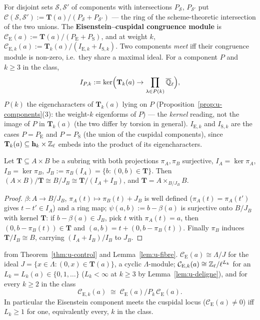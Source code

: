 \documentclass[11pt]{article}
\newcommand{\Iw}{\Lambda}                         %
\newcommand{\hcusp}{\mathbf{h}}                   %
\newcommand{\Tu}{\mathbf{T}}                      %
\newcommand{\Pk}[1]{P_{#1}}                       %
\newcommand{\Eis}{\mathrm{E}}
\newcommand{\cusp}{\mathrm{S}}
\newcommand{\Cg}{\mathcal{C}}                     %
\newcommand{\Qlb}{\overline{\Q}_\ell}
\newcommand{\Zl}{\Z_\ell}
\begin{document}
\begin{definition}\label{def:u-congmod}
For disjoint sets $\mathcal S,\mathcal S'$ of components with intersections $P_{\mathcal S}$, $P_{\mathcal S'}$ put
$\Cg(\mathcal S,\mathcal S'):=\Tu(a)/(P_{\mathcal S}+P_{\mathcal S'})$ --- the ring of the scheme-theoretic intersection of the two
unions. The \textbf{Eisenstein--cuspidal congruence module} is $\Cg_\Eis(a):=\Tu(a)/(P_\Eis+P_\cusp)$, and at weight $k$,
$\Cg_{\Eis,k}(a):=\Tu_k(a)/(I_{\Eis,k}+I_{\cusp,k})$. Two components \emph{meet} iff their congruence module is non-zero, i.e.\ they
share a maximal ideal. For a component $P$ and $k\ge3$ in the class,
\[
  I_{P,k}:=\ker\Bigl(\Tu_k(a)\to\prod_{\lambda\in P(k)}\Qlb\Bigr),
\]
$P(k)$ the eigencharacters of $\Tu_k(a)$ lying on $P$ (Proposition~\ref{prop:u-components}(3): the weight-$k$ eigenforms of $P$) --- the \emph{kernel}
reading, not the image of $P$ in $\Tu_k(a)$ (the two differ by torsion in general). $I_{\Eis,k}$ and $I_{\cusp,k}$ are the cases $P=P_\Eis$ and
$P=P_\cusp$ (the union of the cuspidal components), since $\Tu_k(a)\subseteq\hcusp_k\times\Zl$ embeds into the product of its eigencharacters.
\end{definition}

\begin{lemma}\label{lem:u-fibre}
\PROVED{} Let $\Tu\subseteq A\times B$ be a subring with both projections $\pi_A,\pi_B$ surjective, $I_A=\ker\pi_A$, $I_B=\ker\pi_B$,
$J_B:=\pi_B(I_A)=\{b:(0,b)\in\Tu\}$. Then $(A\times B)/\Tu\cong B/J_B\cong\Tu/(I_A+I_B)$, and $\Tu=A\times_{B/J_B}B$.
\end{lemma}

\begin{proof}
$\beta\colon A\to B/J_B$, $\pi_A(t)\mapsto\pi_B(t)+J_B$ is well defined ($\pi_A(t)=\pi_A(t')$ gives $t-t'\in I_A$) and a ring map;
$\psi(a,b):=b-\beta(a)$ is surjective onto $B/J_B$ with kernel $\Tu$: if $b-\beta(a)\in J_B$, pick $t$ with $\pi_A(t)=a$, then
$(0,b-\pi_B(t))\in\Tu$ and $(a,b)=t+(0,b-\pi_B(t))$. Finally $\pi_B$ induces $\Tu/I_B\cong B$, carrying $(I_A+I_B)/I_B$ to $J_B$.
\end{proof}

\begin{proposition}\label{prop:u-eisspec}
\PROVED{} from Theorem~\ref{thm:u-control} and Lemma~\ref{lem:u-fibre}. $\Cg_\Eis(a)\cong\Iw/J$ for the ideal
$J=\{x\in\Iw:(0,x)\in\Tu(a)\}$, a cyclic $\Iw$-module; $\Cg_{\Eis,k}(a)\cong\Zl/\ell^{L_k}$ for an $L_k=L_k(a)\in\{0,1,\dots\}$ ($L_k<\infty$ at $k\ge3$ by Lemma~\ref{lem:u-deligne}),
and for every $k\ge2$ in the class
\[
  \Cg_{\Eis,k}(a)\;\cong\;\Cg_\Eis(a)/\Pk{k}\,\Cg_\Eis(a).
\]
In particular the Eisenstein component meets the cuspidal locus ($\Cg_\Eis(a)\ne0$) iff $L_k\ge1$ for one, equivalently every, $k$ in
the class.
\end{proposition}
\end{document}
